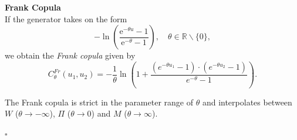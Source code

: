 \textbf{Frank Copula}\\
If the generator takes on the form
\begin{equation}
-\ln \left(\frac{\mathrm{e}^{-\theta u}-1}{\mathrm{e}^{-\theta}-1}\right), \quad \theta \in \mathbb{R} \backslash\{0\},
\end{equation}
we obtain the \textit{Frank copula} given by
\begin{equation}
C_{\theta}^{F r}\left(u_{1}, u_{2}\right)=-\frac{1}{\theta} \ln \left(1+\frac{\left(e^{-\theta u_{1}}-1\right) \cdot\left(e^{-\theta u_{2}}-1\right)}{e^{-\theta}-1}\right).
\end{equation}

The Frank copula is strict in the parameter range of $\theta$ and interpolates between $W$ ($\theta \rightarrow -\infty$), $\Pi$ ($\theta \rightarrow 0$) and $M$ ($\theta \rightarrow \infty$).


\hfill $\square$ \\



